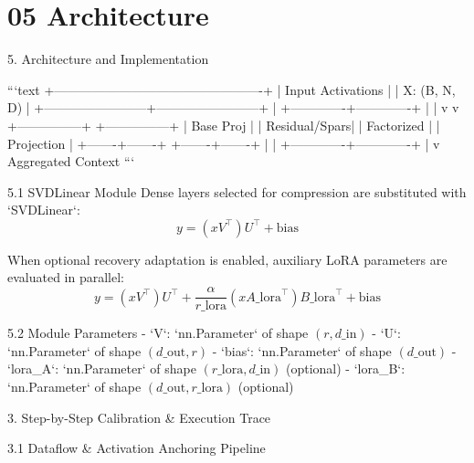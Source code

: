 \section{05 Architecture}

 5. Architecture and Implementation


```text
  +-------------------------------------------------+
  |                Input Activations                |
  |                  X: (B, N, D)                   |
  +------------------------+------------------------+
                           |
             +-------------+-------------+
             |                           |
             v                           v
     +---------------+           +---------------+
     |  Base Proj    |           | Residual/Spars|
     |  Factorized   |           | Projection    |
     +-------+-------+           +-------+-------+
             |                           |
             +-------------+-------------+
                           |
                           v
                   Aggregated Context
```


 5.1 SVDLinear Module
Dense layers selected for compression are substituted with `SVDLinear`:
$$y = (x V^\top) U^\top + \text{bias}$$ 

When optional recovery adaptation is enabled, auxiliary LoRA parameters are evaluated in parallel:
$$y = (x V^\top) U^\top + \frac{\alpha}{r\_{\text{lora}}} (x A\_{\text{lora}}^\top) B\_{\text{lora}}^\top + \text{bias}$$ 

 5.2 Module Parameters
- `V`: `nn.Parameter` of shape $(r, d\_{\text{in}})$ 
- `U`: `nn.Parameter` of shape $(d\_{\text{out}}, r)$ 
- `bias`: `nn.Parameter` of shape $(d\_{\text{out}})$ 
- `lora\_A`: `nn.Parameter` of shape $(r\_{\text{lora}}, d\_{\text{in}})$ (optional) 
- `lora\_B`: `nn.Parameter` of shape $(d\_{\text{out}}, r\_{\text{lora}})$ (optional) 


 3. Step-by-Step Calibration \& Execution Trace


 3.1 Dataflow \& Activation Anchoring Pipeline

